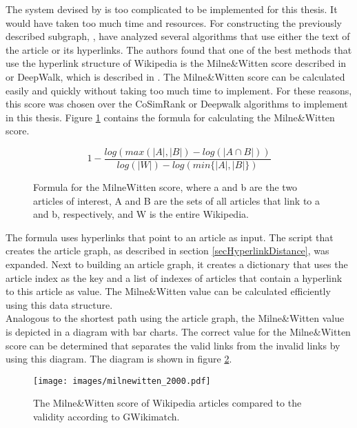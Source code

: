 The system devised by \citet{Ponza2017} is too complicated to be implemented for this thesis. It would have taken too much time and resources. For constructing the previously described subgraph, \citet{Ponza2017}, have analyzed several algorithms that use either the text of the article or its hyperlinks. The authors found that one of the best methods that use the hyperlink structure of Wikipedia is the Milne\&Witten score described in \citep{Witten2008} or DeepWalk, which is described in \citep{deepwalk}. The Milne\&Witten score can be calculated easily and quickly without taking too much time to implement. For these reasons, this score was chosen over the CoSimRank or Deepwalk algorithms to implement in this thesis. Figure \ref{formulaMilneWitten} contains the formula for calculating the Milne\&Witten score.\\

\begin{figure}[h]
$$1 -\frac{ log( max( |A|, | B| )-log(| A \cap B|))}{log(|W|)-log(min\{|A|, |B|\})}$$
\caption{Formula for the Milne\*Witten score, where a and b are the two articles of interest, A and B are the sets of all articles that link to a and b, respectively, and W is the entire Wikipedia. }
\label{formulaMilneWitten}
\end{figure}

The formula uses hyperlinks that point to an article as input. The script that creates the article graph, as described in section \ref{secHyperlinkDistance}, was expanded. Next to building an article graph, it creates a dictionary that uses the article index as the key and a list of indexes of articles that contain a hyperlink to this article as value. The Milne\&Witten value can be calculated efficiently using this data structure.\\

Analogous to the shortest path using the article graph, the Milne\&Witten value is depicted in a diagram with bar charts. The correct value for the Milne\&Witten score can be determined that separates the valid links from the invalid links by using this diagram. The diagram is shown in figure \ref{imgMilneWitten2000}.\\

\begin{figure}[h]
\texttt{[image: images/milnewitten\_2000.pdf]}
\caption{The Milne\&Witten score of Wikipedia articles compared to the validity according to GWikimatch.}
\label{imgMilneWitten2000}
\end{figure}

